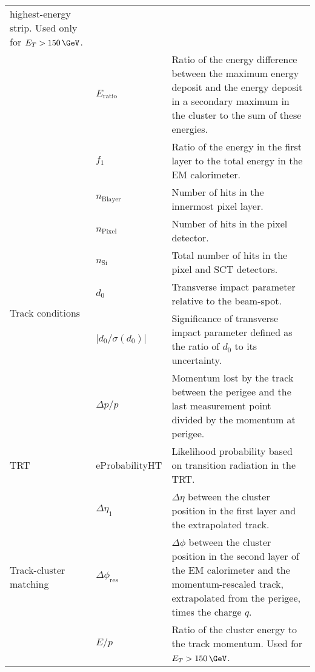 \begin{table}[!htb]
\begin{scriptsize}
\begin{center}
\begin{tabularx}{\textwidth}{|X|l|X|}
            highest-energy strip. Used only for $E_T > 150\,\GeV$.\\ \cline{2-3}
            & $E_{\text{ratio}}$ & Ratio of the energy difference between the maximum energy deposit and the energy deposit
            in a secondary maximum in the cluster to the sum of these energies. \\ \cline{2-3}
            & $f_1$ & Ratio of the energy in the first layer to the total energy in the EM calorimeter.\\
    \hline
    \multirow{6}{*}{Track conditions} & $n_{\text{Blayer}}$ & Number of hits in the innermost pixel layer. \\ \cline{2-3}
            & $n_{\text{Pixel}}$ & Number of hits in the pixel detector. \\ \cline{2-3}
            & $n_{\text{Si}}$ & Total number of hits in the pixel and SCT detectors.\\ \cline{2-3}
            & $d_0$ & Transverse impact parameter relative to the beam-spot. \\ \cline{2-3}
            & $\lvert d_0 / \sigma(d_0) \rvert$ & Significance of transverse impact parameter defined as
            the ratio of $d_0$ to its uncertainty. \\ \cline{2-3}
            & $\Delta p / p$ &  Momentum lost by the track between the perigee and the last measurement point
            divided by the momentum at perigee. \\
    \hline
    \multirow{1}{*}{TRT} & eProbabilityHT & Likelihood probability based on transition radiation in the TRT. \\
    \hline
    \multirow{3}{*}{Track-cluster matching} & $\Delta \eta_1$  & $\Delta \eta$ between the cluster position in the first layer
            and the extrapolated track. \\ \cline{2-3}
            & $\Delta \phi_{\text{res}}$ & $\Delta \phi$ between the cluster position in the second layer of the EM calorimeter
            and the momentum-rescaled track, extrapolated from the perigee, times the charge $q$. \\ \cline{2-3}
            & $E/p$ & Ratio of the cluster energy to the track momentum. Used for $E_T>150\,\GeV$.\\
    \hline
    \hline
    \end{tabularx}
    \end{center}
    \end{scriptsize}
\end{table}
